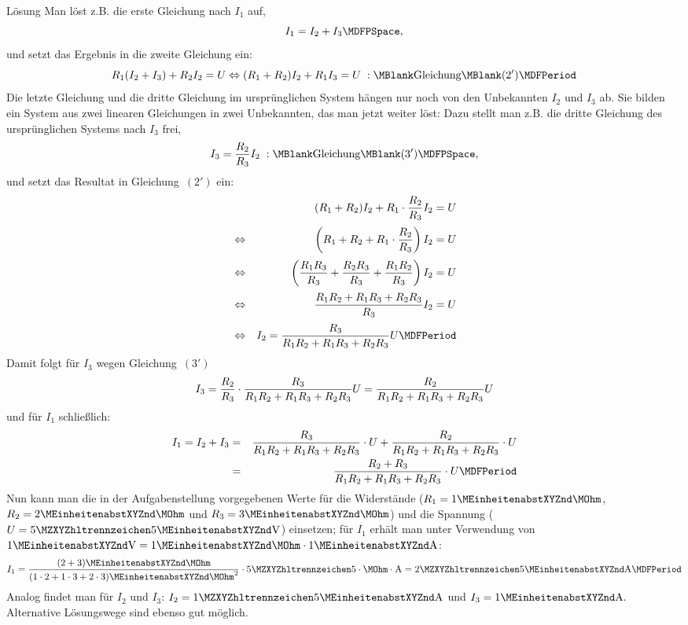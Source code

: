 \begin{MExercises}
\begin{MExercise}
\begin{MHint}{Lösung}
Man löst z.B. die erste Gleichung nach $I_1$ auf,
$$I_1 = I_2 + I_3 \MDFPSpace ,$$
und setzt das Ergebnis in die zweite Gleichung ein:
$$R_1 (I_2 + I_3) + R_2 I_2 = U \Leftrightarrow (R_1 + R_2) I_2 + R_1 I_3 = U \; : \MBlank\mbox{Gleichung}\MBlank (2') \MDFPeriod$$
Die letzte Gleichung und die dritte Gleichung im ursprünglichen System hängen nur noch von den Unbekannten
$I_2$ und $I_3$ ab. Sie bilden ein System aus zwei linearen Gleichungen in zwei Unbekannten, das man jetzt
weiter löst: Dazu stellt man z.B. die dritte Gleichung des ursprünglichen Systems nach $I_3$ frei,
$$I_3 = \Mdfrac{R_2}{R_3} I_2 \; : \MBlank\mbox{Gleichung}\MBlank (3') \MDFPSpace ,$$
und setzt das Resultat in Gleichung~$(2')$ ein:
\begin{eqnarray*}
& & (R_1 + R_2) I_2 + R_1 \cdot \Mdfrac{R_2}{R_3} I_2 = U \\[.5ex]
& \Leftrightarrow & \left( R_1 + R_2 + R_1 \cdot \Mdfrac{R_2}{R_3} \right) I_2 = U \\[.5ex]
& \Leftrightarrow & \left( \Mdfrac{R_1 R_3}{R_3} + \Mdfrac{R_2 R_3}{R_3} + \Mdfrac{R_1 R_2}{R_3} \right) I_2 = U \\[.5ex]
& \Leftrightarrow & \Mdfrac{R_1 R_2 + R_1 R_3 + R_2 R_3}{R_3} I_2 = U \\[.5ex]
& \Leftrightarrow & I_2 = \Mdfrac{R_3}{R_1 R_2 + R_1 R_3 + R_2 R_3} U \MDFPeriod
\end{eqnarray*}
Damit folgt für $I_3$ wegen Gleichung~$(3')$
$$I_3 = \dfrac{R_2}{R_3} \cdot \dfrac{R_3}{R_1 R_2 + R_1 R_3 + R_2 R_3} U = \dfrac{R_2}{R_1 R_2 + R_1 R_3 + R_2 R_3} U$$
und für $I_1$ schließlich:
\begin{eqnarray*}
  I_1 = I_2 + I_3 &=& \Mdfrac{R_3}{R_1 R_2 + R_1 R_3 + R_2 R_3} \cdot U + \Mdfrac{R_2}{R_1 R_2 + R_1 R_3 + R_2 R_3} \cdot U \\
  &=& \Mdfrac{R_2 + R_3}{R_1 R_2 + R_1 R_3 + R_2 R_3} \cdot U \MDFPeriod
\end{eqnarray*}
Nun kann man die in der Aufgabenstellung vorgegebenen Werte für die Widerstände
($R_1 = 1\MEinheit{}\MOhm$, $R_2 = 2\MEinheit{}\MOhm$ und $R_3 = 3\MEinheit{}\MOhm$)
und die Spannung ($U = \MZahl{5}{5}\MEinheit{V}$) einsetzen; für $I_1$ erhält man unter Verwendung von $1\MEinheit{V} = 1\MEinheit{}\MOhm \cdot 1\MEinheit{A}$:
$$I_1 = \Mdfrac{(2 + 3)\MEinheit{}\MOhm}{(1 \cdot 2 + 1 \cdot 3 + 2 \cdot 3)\MEinheit{}\MOhm^2} \cdot \MZahl{5}{5} \cdot \MOhm \cdot \MEinheit[]{A}
= \MZahl{2}{5}\MEinheit{A} \MDFPeriod$$
Analog findet man für $I_2$ und $I_3$: $I_2 = \MZahl{1}{5}\MEinheit{A}$ und $I_3 = 1\MEinheit{A}.$\\
Alternative Lösungswege sind ebenso gut möglich.
\end{MHint}
\end{MExercise}


\end{MExercises}
